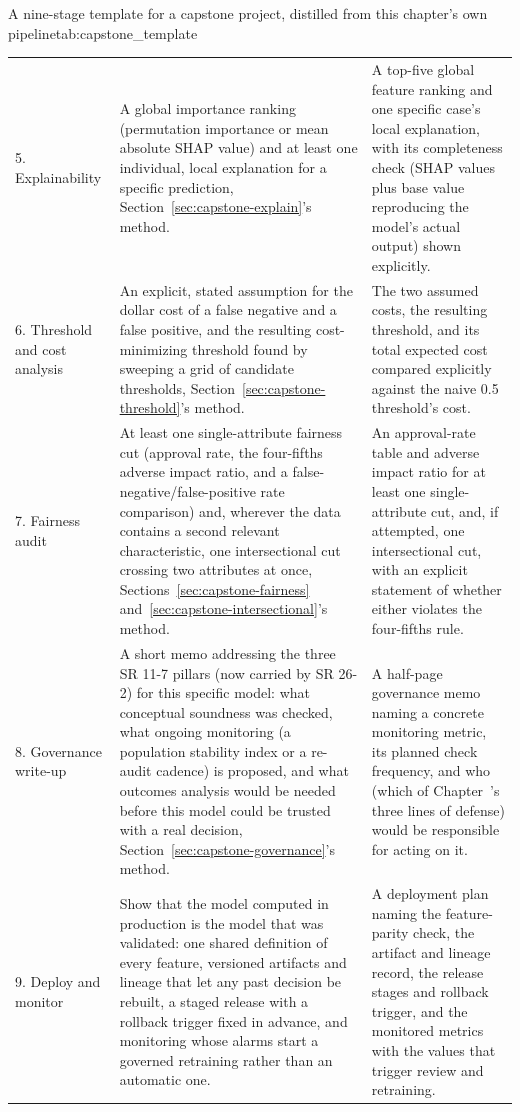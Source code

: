 \documentclass[../ai_in_finance]{subfiles}
\begin{document}
\begin{booktable}[htbp]{A nine-stage template for a capstone project, distilled from this chapter's own pipeline}{tab:capstone_template}
\begin{tabular}{L{2.1cm}L{6.9cm}L{6.1cm}}
5. Explainability & A global importance ranking (permutation importance or mean absolute SHAP value) and at least one individual, local explanation for a specific prediction, Section~\ref{sec:capstone-explain}'s method. & A top-five global feature ranking and one specific case's local explanation, with its completeness check (SHAP values plus base value reproducing the model's actual output) shown explicitly. \\
6. Threshold and cost analysis & An explicit, stated assumption for the dollar cost of a false negative and a false positive, and the resulting cost-minimizing threshold found by sweeping a grid of candidate thresholds, Section~\ref{sec:capstone-threshold}'s method. & The two assumed costs, the resulting threshold, and its total expected cost compared explicitly against the naive 0.5 threshold's cost. \\
7. Fairness audit & At least one single-attribute fairness cut (approval rate, the four-fifths adverse impact ratio, and a false-negative/false-positive rate comparison) and, wherever the data contains a second relevant characteristic, one intersectional cut crossing two attributes at once, Sections~\ref{sec:capstone-fairness} and~\ref{sec:capstone-intersectional}'s method. & An approval-rate table and adverse impact ratio for at least one single-attribute cut, and, if attempted, one intersectional cut, with an explicit statement of whether either violates the four-fifths rule. \\
8. Governance write-up & A short memo addressing the three SR 11-7 pillars (now carried by SR 26-2) for this specific model: what conceptual soundness was checked, what ongoing monitoring (a population stability index or a re-audit cadence) is proposed, and what outcomes analysis would be needed before this model could be trusted with a real decision, Section~\ref{sec:capstone-governance}'s method. & A half-page governance memo naming a concrete monitoring metric, its planned check frequency, and who (which of Chapter~'s three lines of defense) would be responsible for acting on it. \\
9. Deploy and monitor & Show that the model computed in production is the model that was validated: one shared definition of every feature, versioned artifacts and lineage that let any past decision be rebuilt, a staged release with a rollback trigger fixed in advance, and monitoring whose alarms start a governed retraining rather than an automatic one. & A deployment plan naming the feature-parity check, the artifact and lineage record, the release stages and rollback trigger, and the monitored metrics with the values that trigger review and retraining. \\
\bottomrule
\end{tabular}
\end{booktable}
\end{document}
